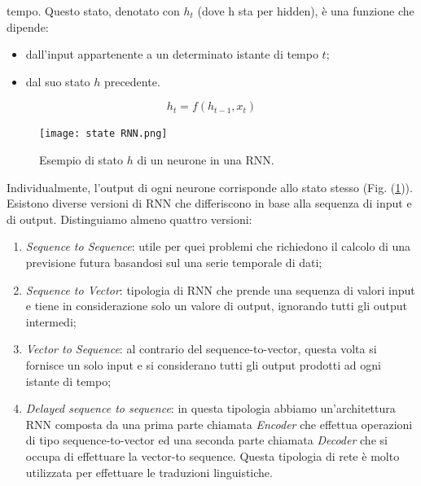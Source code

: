 tempo. Questo stato, denotato con $h_t$ (dove h sta per hidden), è una 
funzione che dipende:
\begin{itemize}
    \item dall'input appartenente a un determinato istante di tempo $t$;
    \item dal suo stato $h$ precedente.
\end{itemize}
\begin{equation}
    h_t = f(h_{t-1}, x_t)
\end{equation}
\begin{figure}
    \centering
    \texttt{[image: state RNN.png]}
    \centering
    \caption{Esempio di stato $h$ di un neurone in una RNN.}
    \label{state-neuron-rnn}
\end{figure}
Individualmente, l'output di ogni neurone corrisponde allo stato stesso 
(Fig. (\ref{state-neuron-rnn})). Esistono diverse versioni di RNN che differiscono in base alla 
sequenza di input e di output. Distinguiamo almeno quattro versioni:
\begin{enumerate}
    \item \emph{Sequence to Sequence}: utile per quei problemi che richiedono il calcolo 
    di una previsione futura basandosi sul una serie temporale di dati;
    \item \emph{Sequence to Vector}: tipologia di RNN che prende una sequenza di 
    valori input e tiene in considerazione solo un valore di output, ignorando 
    tutti gli output intermedi;
    \item \emph{Vector to Sequence}: al contrario del sequence-to-vector, questa volta 
    si fornisce un solo input e si considerano tutti gli output prodotti ad 
    ogni istante di tempo;
    \item \emph{Delayed sequence to sequence}: in questa tipologia abbiamo un'architettura 
    RNN composta da una prima parte chiamata \emph{Encoder} che 
    effettua operazioni di tipo sequence-to-vector ed una seconda parte 
    chiamata \emph{Decoder} che si occupa di effettuare la vector-to sequence. 
    Questa tipologia di rete è molto utilizzata per effettuare le traduzioni 
    linguistiche. 
\end{enumerate}

